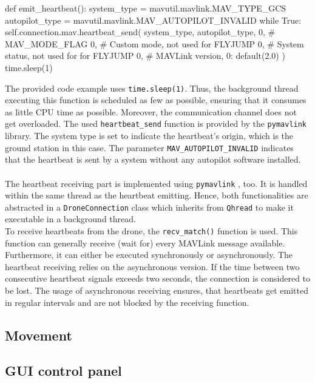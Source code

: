 \begin{pythoncode}[caption=Sending mavlink heartbeats,label=alg:heartbeat_mav_send]
    def emit_heartbeat():
        system_type = mavutil.mavlink.MAV_TYPE_GCS
        autopilot_type = mavutil.mavlink.MAV_AUTOPILOT_INVALID
        while True:
            self.connection.mav.heartbeat_send(
                system_type,
                autopilot_type,
                0,  # MAV_MODE_FLAG
                0,  # Custom mode, not used for FLYJUMP
                0,  # System status, not used for for FLYJUMP
                0,  # MAVLink version, 0: default(2.0)
            )
            time.sleep(1)
\end{pythoncode}
The provided code example uses \texttt{time.sleep(1)}.
Thus, the background thread executing this function is scheduled as few as
possible, ensuring that it consumes as little \ac{CPU} time as possible.
Moreover, the communication channel does not get overloaded.
The used \texttt{heartbeat\_send} function is provided by the
\texttt{pymavlink} library.
The system type is set to indicate the heartbeat's origin, which is the ground
station in this case.
The parameter \texttt{MAV\_AUTOPILOT\_INVALID} indicates that the heartbeat is
sent by a system without any autopilot software installed.\\\\
\noindent The heartbeat receiving part is implemented using \texttt{pymavlink}
, too.
It is handled within the same thread as the heartbeat emitting.
Hence, both functionalities are abstracted in a \texttt{DroneConnection} class
which inherits from \texttt{Qhread} to make it executable in a background
thread.\\
To receive heartbeats from the drone, the \texttt{recv\_match()} function is
used.
This function can generally receive (wait for) every MAVLink message
available.
Furthermore, it can either be executed synchronously or asynchronously.
The heartbeat receiving relies on the asynchronous version.
If the time between two consecutive heartbeat signals exceeds two seconds, the
connection is considered to be lost.
The usage of asynchronous receiving ensures, that heartbeats get emitted in
regular intervals and are not blocked by the receiving function.

\subsection{Movement}\label{subsec:4_drone_mvmnt}
\subsection{GUI control panel}\label{subsec:4_drone_ctrl_panel_gui}
